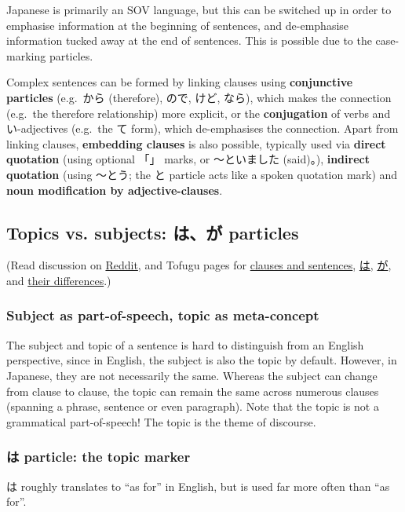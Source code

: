\documentclass[../nihongo-gakushuu-kyouzai.tex]{subfiles}
\begin{document}
Japanese is primarily an SOV language, but this can be switched up in order to emphasise information at the beginning of sentences, and de-emphasise information tucked away at the end of sentences. This is possible due to the case-marking particles.

Complex sentences can be formed by linking clauses using \textbf{conjunctive particles} (e.g.\ から (therefore), ので, けど, なら), which makes the connection (e.g.\ the therefore relationship) more explicit, or the \textbf{conjugation} of verbs and い-adjectives (e.g.\ the て form), which de-emphasises the connection. Apart from linking clauses, \textbf{embedding clauses} is also possible, typically used via \textbf{direct quotation} (using optional 「」 marks, or 〜といました (said)。), \textbf{indirect quotation} (using 〜とう; the と particle acts like a spoken quotation mark) and \textbf{noun modification by adjective-clauses}.

\subsection{Topics vs. subjects: は、が particles} \label{sec:topics-and-subjects}
(Read discussion on \href{https://www.reddit.com/r/LearnJapanese/comments/jt49jj/please_stop_thinking_in_terms_of_\%E3\%81\%AF_vs_\%E3\%81\%8C/}{Reddit}, and Tofugu pages for \href{https://www.tofugu.com/japanese-grammar/sentences-and-clauses/}{clauses and sentences}, \href{https://www.tofugu.com/japanese-grammar/particle-wa/}{は}, \href{https://www.tofugu.com/japanese-grammar/particle-ga/}{が}, and \href{https://www.tofugu.com/japanese/wa-and-ga/}{their differences}.)

\subsubsection{Subject as part-of-speech, topic as meta-concept}
The subject and topic of a sentence is hard to distinguish from an English perspective, since in English, the subject is also the topic by default. However, in Japanese, they are not necessarily the same. Whereas the subject can change from clause to clause, the topic can remain the same across numerous clauses (spanning a phrase, sentence or even paragraph). Note that the topic is not a grammatical part-of-speech! The topic is the theme of discourse.

\subsubsection{は particle: the topic marker}
は roughly translates to ``as for'' in English, but is used far more often than ``as for''.
\end{document}
